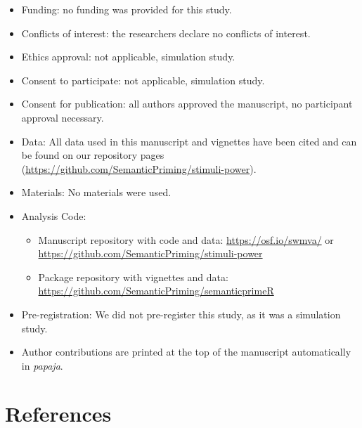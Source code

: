 \documentclass[
  man]{apa7}
\providecommand{\tightlist}{%
  \setlength{\itemsep}{0pt}\setlength{\parskip}{0pt}}
\begin{document}
\begin{itemize}
\tightlist
\item
  Funding: no funding was provided for this study.
\item
  Conflicts of interest: the researchers declare no conflicts of interest.
\item
  Ethics approval: not applicable, simulation study.
\item
  Consent to participate: not applicable, simulation study.
\item
  Consent for publication: all authors approved the manuscript, no participant approval necessary.
\item
  Data: All data used in this manuscript and vignettes have been cited and can be found on our repository pages (\url{https://github.com/SemanticPriming/stimuli-power}).
\item
  Materials: No materials were used.
\item
  Analysis Code:

  \begin{itemize}
  \tightlist
  \item
    Manuscript repository with code and data: \url{https://osf.io/swmva/} or \url{https://github.com/SemanticPriming/stimuli-power}
  \item
    Package repository with vignettes and data: \url{https://github.com/SemanticPriming/semanticprimeR}
  \end{itemize}
\item
  Pre-registration: We did not pre-register this study, as it was a simulation study.
\item
  Author contributions are printed at the top of the manuscript automatically in \emph{papaja}.
\end{itemize}

\newpage

\section{References}\label{references}

\begingroup
\setlength{\parindent}{-0.5in}
\setlength{\leftskip}{0.5in}
\end{document}
